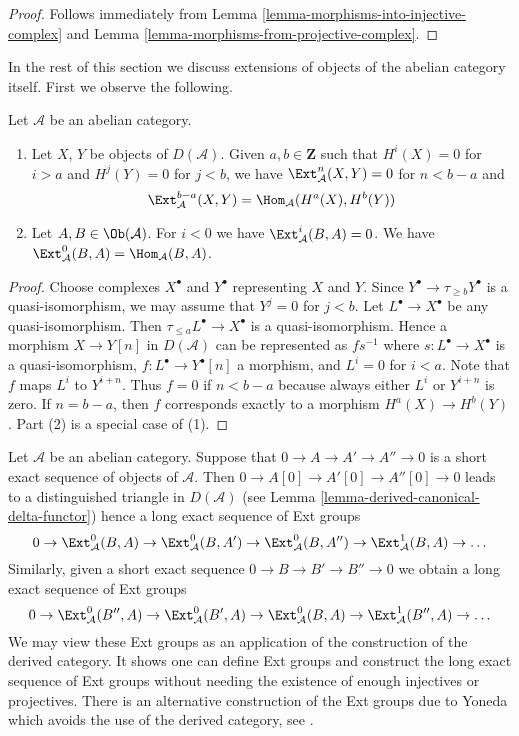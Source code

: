 \begin{proof}
Follows immediately from
Lemma \ref{lemma-morphisms-into-injective-complex}
and
Lemma \ref{lemma-morphisms-from-projective-complex}.
\end{proof}

\noindent
In the rest of this section we discuss extensions of objects of the
abelian category itself. First we observe the following.

\begin{lemma}
\label{lemma-negative-exts}
Let $\mathcal{A}$ be an abelian category.
\begin{enumerate}
\item Let $X$, $Y$ be objects of $D(\mathcal{A})$. Given $a, b \in \mathbf{Z}$
such that $H^i(X) = 0$ for $i > a$ and $H^j(Y) = 0$
for $j < b$, we have $\Ext^n_\mathcal{A}(X, Y) = 0$ for
$n < b - a$ and
$$
\Ext^{b - a}_\mathcal{A}(X, Y) = \Hom_\mathcal{A}(H^a(X), H^b(Y))
$$
\item Let $A, B \in \Ob(\mathcal{A})$.
For $i < 0$ we have $\Ext^i_\mathcal{A}(B, A) = 0$.
We have $\Ext^0_\mathcal{A}(B, A) = \Hom_\mathcal{A}(B, A)$.
\end{enumerate}
\end{lemma}

\begin{proof}
Choose complexes $X^\bullet$ and $Y^\bullet$ representing $X$ and $Y$.
Since $Y^\bullet \to \tau_{\geq b}Y^\bullet$ is a quasi-isomorphism,
we may assume that $Y^j = 0$ for $j < b$.
Let $L^\bullet \to X^\bullet$ be any quasi-isomorphism.
Then $\tau_{\leq a}L^\bullet \to X^\bullet$
is a quasi-isomorphism. Hence a morphism $X \to Y[n]$
in $D(\mathcal{A})$ can be represented as $fs^{-1}$ where
$s : L^\bullet \to X^\bullet$ is a quasi-isomorphism,
$f : L^\bullet \to Y^\bullet[n]$ a morphism, and
$L^i = 0$ for $i < a$. Note that $f$ maps $L^i$ to $Y^{i + n}$.
Thus $f = 0$ if $n < b - a$ because always either $L^i$ or $Y^{i + n}$ is
zero. If $n = b - a$, then $f$ corresponds exactly to a morphism
$H^a(X) \to H^b(Y)$. Part (2) is a special case of (1).
\end{proof}

\noindent
Let $\mathcal{A}$ be an abelian category.
Suppose that $0 \to A \to A' \to A'' \to 0$ is a short exact
sequence of objects of $\mathcal{A}$. Then
$0 \to A[0] \to A'[0] \to A''[0] \to 0$ leads to a distinguished
triangle in $D(\mathcal{A})$ (see
Lemma \ref{lemma-derived-canonical-delta-functor})
hence a long exact sequence of Ext groups
$$
0 \to \Ext^0_\mathcal{A}(B, A) \to
\Ext^0_\mathcal{A}(B, A') \to
\Ext^0_\mathcal{A}(B, A'') \to
\Ext^1_\mathcal{A}(B, A) \to \ldots
$$
Similarly, given a short exact sequence $0 \to B \to B' \to B'' \to 0$
we obtain a long exact sequence of Ext groups
$$
0 \to \Ext^0_\mathcal{A}(B'', A) \to
\Ext^0_\mathcal{A}(B', A) \to
\Ext^0_\mathcal{A}(B, A) \to
\Ext^1_\mathcal{A}(B'', A) \to \ldots
$$
We may view these Ext groups as an application of the construction of the
derived category. It shows one can define Ext groups and construct
the long exact sequence of Ext groups without needing the existence of enough
injectives or projectives. There is an alternative construction of the Ext
groups due to Yoneda which avoids the use of the derived category, see
\cite{Yoneda}.

